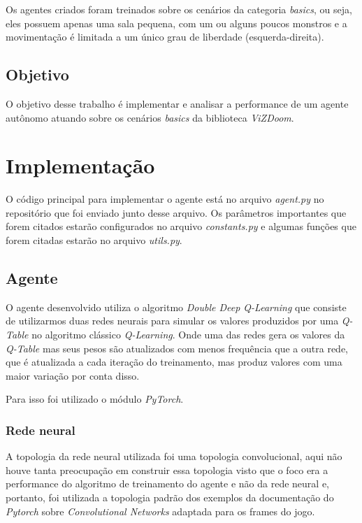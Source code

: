 \documentclass[12pt]{article}
\begin{document}
Os agentes criados foram treinados sobre os cenários da categoria \textit{basics}, ou seja, eles possuem apenas uma sala pequena, com um ou alguns poucos monstros e a movimentação é limitada a um único grau de liberdade (esquerda-direita).

\subsection{Objetivo}

O objetivo desse trabalho é implementar e analisar a performance de um agente autônomo atuando sobre os cenários \textit{basics} da biblioteca \textit{ViZDoom}.

\section{Implementação}

O código principal para implementar o agente está no arquivo \textit{agent.py} no repositório que foi enviado junto desse arquivo. Os parâmetros importantes que forem citados estarão configurados no arquivo \textit{constants.py} e algumas funções que forem citadas estarão no arquivo \textit{utils.py}.

\subsection{Agente}

O agente desenvolvido utiliza o algoritmo \textit{Double Deep Q-Learning}\cite{vanhasselt2015deep} que consiste de utilizarmos duas redes neurais para simular os valores produzidos por uma \textit{Q-Table} no algoritmo clássico \textit{Q-Learning}. Onde uma das redes gera os valores da \textit{Q-Table} mas seus pesos são atualizados com menos frequência que a outra rede, que é atualizada a cada iteração do treinamento, mas produz valores com uma maior variação por conta disso.

Para isso foi utilizado o módulo \textit{PyTorch}.

\subsubsection{Rede neural}

A topologia da rede neural utilizada foi uma topologia convolucional, aqui não houve tanta preocupação em construir essa topologia visto que o foco era a performance do algoritmo de treinamento do agente e não da rede neural e, portanto, foi utilizada a topologia padrão dos exemplos da documentação do \textit{Pytorch} sobre \textit{Convolutional Networks} adaptada para os frames do jogo.
\end{document}
